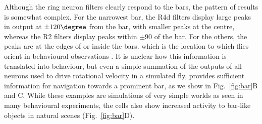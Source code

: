 Although the ring neuron filters clearly respond to the bars, the pattern of results is somewhat complex.
For the narrowest bar, the R4d filters display large peaks in output at $\pm 120\degree$ from the bar, with smaller peaks at the centre, whereas the R2 filters display peaks within $\pm 90$ of the bar.
For the others, the peaks are at the edges of or inside the bars.
which is the location to which flies orient in behavioural observations \cite{Osorio1990}.
It is unclear how this information is translated into behaviour, but even a simple summation of the outputs of all neurons used to drive rotational velocity in a simulated fly, provides sufficient information for navigation towards a prominent bar, as we show in Fig.~\ref{fig:bar}B and C.
While these examples are simulations of very simple worlds as seen in many behavioural experiments, the cells also show increased activity to bar-like objects in natural scenes (Fig.~\ref{fig:bar}D).

\begin{comment}
To assess the ability of R2 and R4d neurons to fixate bars we simulated the visual input that would be experienced by a fly approaching vertical bars of different widths (OR: in  a number of situations) and examined the activity provoked. It is known that flies approach …  In the first instance we assumed the fly was at a fixed distance from the bars and examined mean activity for different azimuthal orientations/facing directions. [Both R2 and R4d neurons showed interesting responses (Fig.~\ref{fig:bar}A).] The R4d neurons, which are known to play a role in spatial orientation memory for bars \cite{Neuser2008}, showed peaks in activation at $\pm 90\degree$ from the bar's centre, the heading at which an agent performing bar fixation would saccade the most.
The R2 neurons, however, showed peaks towards the inside edges of the largest bars, which is the location to which flies orient in behavioural observations \cite{Osorio1990}. It is unclear how this information is translated into behaviour, but even a simple summation of the outputs of all neurons used to drive rotational velocity in a simulated fly, provides sufficient information for navigation towards a prominent bar [do we get avoidance? do flies show avoidance?] (Fig.~\ref{fig:bar}B and C). While these examples are simulations of very simple worlds as seen in many behavioural experiments, the cells also show increased activity to bar-like objects in natural scenes. As we see in Fig.~\ref{fig:bar}D, …. [Figure messy, tidy or find better ex]
\end{comment}

